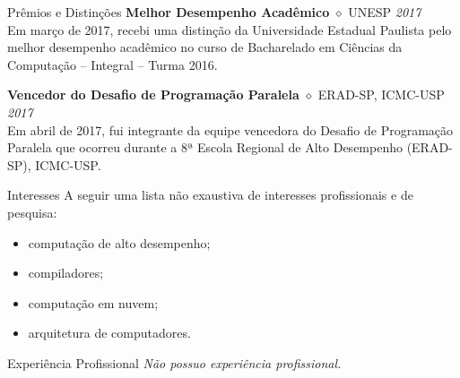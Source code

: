 \documentclass[a4paper]{resume}
\begin{document}
\begin{rSection}{Prêmios e Distinções}
{\bf Melhor Desempenho Acadêmico} $\diamond$ {UNESP} \hfill{\em 2017} \\
Em março de 2017, recebi uma distinção da Universidade Estadual Paulista pelo
melhor desempenho acadêmico no curso de Bacharelado em Ciências da Computação --
Integral -- Turma 2016.

{\bf Vencedor do Desafio de Programação Paralela} $\diamond$ {ERAD-SP, ICMC-USP} \hfill{\em 2017} \\
Em abril de 2017, fui integrante da equipe vencedora do Desafio de Programação
Paralela que ocorreu durante a 8ª Escola Regional de Alto Desempenho (ERAD-SP),
ICMC-USP.
\end{rSection}

\begin{rSection}{Interesses}
A seguir uma lista não exaustiva de interesses profissionais e de pesquisa:

\setlength\multicolsep{5pt}
\begin{multicols}{2}
\begin{itemize}[noitemsep]
  \item computação de alto desempenho;
  \item compiladores;
  \item computação em nuvem;
  \item arquitetura de computadores.
\end{itemize}
\end{multicols}

\end{rSection}


\begin{rSection}{Experiência Profissional}
{\it Não possuo experiência profissional.}
\end{rSection}

\end{document}
